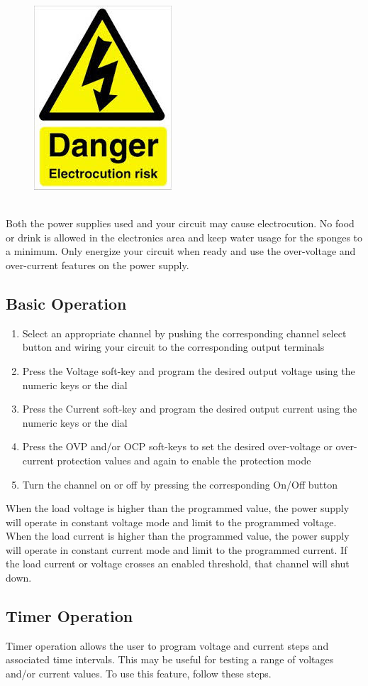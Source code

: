 \begin{framed}
\begin{figure}
\includegraphics[width=.7in]{images/electrocution_hazard}
\end{figure}
\ \\
Both the power supplies used and your circuit may cause electrocution.  No food or drink is allowed in the electronics area and keep water usage for the sponges to a minimum.  Only energize your circuit when ready and use the over-voltage and over-current features on the power supply.
\end{framed}
\subsection{Basic Operation}
\begin{enumerate}
\item Select an appropriate channel by pushing the corresponding channel select button and wiring your circuit to the corresponding output terminals
\item Press the Voltage soft-key and program the desired output voltage using the numeric keys or the dial
\item Press the Current soft-key and program the desired output current using the numeric keys or the dial
\item Press the OVP and/or OCP soft-keys to set the desired over-voltage or over-current protection values and again to enable the protection mode
\item Turn the channel on or off by pressing the corresponding On/Off button 
\end{enumerate}

When the load voltage is higher than the programmed value, the power supply will operate in constant voltage mode and limit to the programmed voltage.  When the load current is higher than the programmed value, the power supply will operate in constant current mode and limit to the programmed current.  If the load current or voltage crosses an enabled threshold, that channel will shut down.
\subsection{Timer Operation}
Timer operation allows the user to program voltage and current steps and associated time intervals.  This may be useful for testing a range of voltages and/or current values.  To use this feature, follow these steps.

